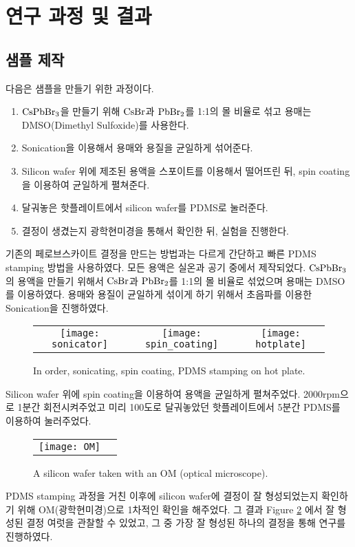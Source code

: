 \section{연구 과정 및 결과}

\subsection{샘플 제작}
다음은 샘플을 만들기 위한 과정이다.
\begin{enumerate}
	\item $\rm CsPbBr_3$을 만들기 위해 $\rm CsBr$과 $\rm PbBr_2$를 1:1의 몰 비율로 섞고 용매는 DMSO(Dimethyl Sulfoxide)를 사용한다.
	\item Sonication을 이용해서 용매와 용질을 균일하게 섞어준다.
	\item Silicon wafer 위에 제조된 용액을 스포이트를 이용해서 떨어뜨린 뒤, spin coating을 이용하여 균일하게 펼쳐준다.
	\item 달궈놓은 핫플레이트에서 silicon wafer를 PDMS로 눌러준다.
	\item 결정이 생겼는지 광학현미경을 통해서 확인한 뒤, 실험을 진행한다. 
\end{enumerate}
기존의 페로브스카이트 결정을 만드는 방법과는 다르게 간단하고 빠른 PDMS stamping 방법을 사용하였다.
모든 용액은 실온과 공기 중에서 제작되었다. $\rm CsPbBr_3$의 용액을 만들기 위해서 $\rm CsBr$과 $\rm PbBr_2$를 1:1의 몰 비율로 섞었으며 용매는 DMSO를 이용하였다. 용매와 용질이 균일하게 섞이게 하기 위해서 초음파를 이용한 Sonication을 진행하였다.
\begin{figure}[H]
	\begin{center}
		\begin{tabular}{ccc}
			\texttt{[image: sonicator]}&
			\texttt{[image: spin\_coating]}&
			\texttt{[image: hotplate]}
		\end{tabular}
	\end{center}
	\caption{In order, sonicating, spin coating, PDMS stamping on hot plate.}
	\label{fig:sample}  
\end{figure}

Silicon wafer 위에 spin coating을 이용하여 용액을 균일하게 펼쳐주었다. 2000rpm으로 1분간 회전시켜주었고 미리 100도로 달궈놓았던 핫플레이트에서 5분간 PDMS를 이용하여 눌러주었다.

\begin{figure}[H]
	\begin{center}
		\begin{tabular}{cc}
			\texttt{[image: OM]}
		\end{tabular}
	\end{center}
	\caption{A silicon wafer taken with an OM (optical microscope).}
	\label{fig:om}  
\end{figure}
PDMS stamping 과정을 거친 이후에 silicon wafer에 결정이 잘 형성되었는지 확인하기 위해 OM(광학현미경)으로 1차적인 확인을 해주었다. 그 결과 Figure \ref{fig:om} 에서 잘 형성된 결정 여럿을 관찰할 수 있었고, 그 중 가장 잘 형성된 하나의 결정을 통해 연구를 진행하였다.


